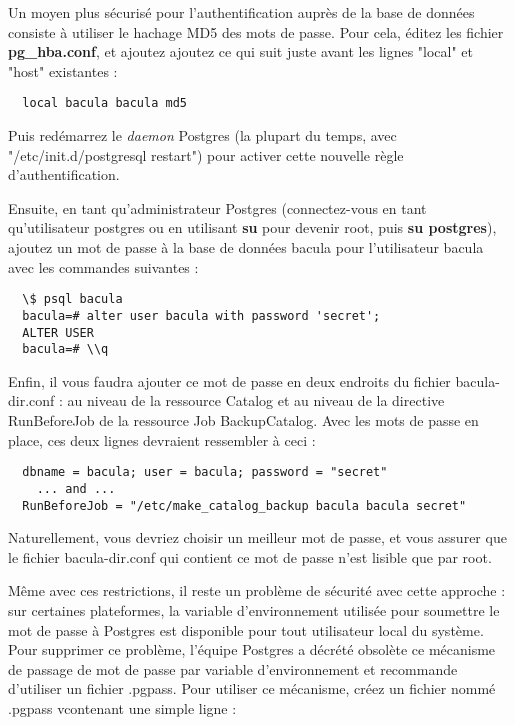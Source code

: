 {{{{Un moyen plus s\'ecuris\'e pour l'authentification aupr\`es de la base de donn\'ees 
consiste \`a utiliser le hachage MD5 des mots de passe. Pour cela, \'editez les 
fichier {\bf pg\_hba.conf}, et ajoutez ajoutez ce qui suit juste avant les lignes 
"local" et "host" existantes :

\footnotesize
\begin{verbatim}
  local bacula bacula md5
\end{verbatim}
\normalsize

Puis red\'emarrez le {\it daemon} Postgres (la plupart du temps, avec 
 "/etc/init.d/postgresql restart") pour activer cette nouvelle r\`egle 
d'authentification.

Ensuite, en tant qu'administrateur Postgres (connectez-vous en tant 
qu'utilisateur postgres ou en utilisant {\bf su} pour devenir root, puis 
 {\bf su postgres}), ajoutez un mot de passe \`a la base de donn\'ees bacula 
pour l'utilisateur bacula avec les commandes suivantes :

\footnotesize
\begin{verbatim}
  \$ psql bacula
  bacula=# alter user bacula with password 'secret';
  ALTER USER
  bacula=# \\q
\end{verbatim}
\normalsize

Enfin, il vous faudra ajouter ce mot de passe en deux endroits du fichier 
bacula-dir.conf : au niveau de la ressource Catalog et au niveau de la 
directive RunBeforeJob de la ressource Job BackupCatalog. Avec les mots de 
passe en place, ces deux lignes devraient ressembler \`a ceci :

\footnotesize
\begin{verbatim}
  dbname = bacula; user = bacula; password = "secret"
    ... and ...
  RunBeforeJob = "/etc/make_catalog_backup bacula bacula secret"
\end{verbatim}
\normalsize

Naturellement, vous devriez choisir un meilleur mot de passe, et vous assurer 
que le fichier bacula-dir.conf qui contient ce mot de passe n'est lisible 
que par root.

M\^eme avec ces restrictions, il reste un probl\`eme de s\'ecurit\'e avec cette approche : 
sur certaines plateformes, la variable d'environnement utilis\'ee pour soumettre le 
mot de passe \`a Postgres est disponible pour tout utilisateur 
local du syst\`eme. Pour supprimer ce probl\`eme, l'\'equipe Postgres a d\'ecr\'et\'e 
obsol\`ete ce m\'ecanisme de passage de mot de passe par variable d'environnement et 
recommande d'utiliser un fichier .pgpass. Pour utiliser ce m\'ecanisme, cr\'eez un fichier 
nomm\'e .pgpass vcontenant une simple ligne :

}}}}
